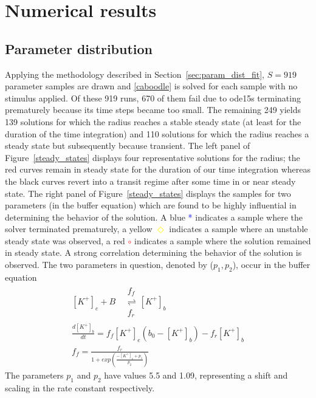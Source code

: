 \section{Numerical results}
\label{sec:results}

\subsection{Parameter distribution}
\label{sec:param_sampling}

Applying the methodology described in Section~\ref{sec:param_dist_fit}, $S=919$ parameter samples are drawn and \eqref{caboodle} is solved for each sample with no stimulus applied. Of these 919 runs, 670 of them fail due to ode15s terminating prematurely because its time steps became too small. The remaining 249 yields 139 solutions for which the radius reaches a stable steady state (at least for the duration of the time integration) and 110 solutions for which the radius reaches a steady state but subsequently because transient. The left panel of Figure~\ref{steady_states} displays four representative solutions for the radius; the red curves remain in steady state for the duration of our time integration whereas the black curves revert into a transit regime after some time in or near steady state. The right panel of Figure~\ref{steady_states} displays the samples for two parameters (in the buffer equation) which are found to be highly influential in determining the behavior of the solution. A blue \textcolor{blue}{*} indicates a sample where the solver terminated prematurely, a yellow \textcolor{yellow}{$\Diamond$} indicates a sample where an unstable steady state was observed, a red \textcolor{red}{$\circ$} indicates a sample where the solution remained in steady state. A strong correlation determining the behavior of the solution is observed. The two parameters in question, denoted by ($p_1,p_2$), occur in the buffer equation
\begin{eqnarray}\label{eqn:buff}
[K^+]_e+B \quad\begin{array}{c}
f_f \\ 
 \rightleftharpoons \\
f_r
\end{array} 
[K^+]_b \nonumber \\
\frac{d[K^+]_b}{dt}=f_f[K^+]_e(b_0-[K^+]_b)-f_r[K^+]_b \nonumber \\
f_f=\frac{f_r}{1+exp(\frac{-[K^+]_e+p_1}{p_2})}
\end{eqnarray}
The parameters $p_1$ and $p_2$ have values 5.5 and 1.09, representing a shift and scaling in the rate constant respectively. 
